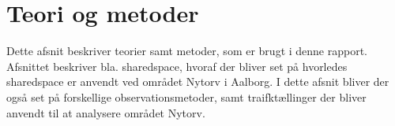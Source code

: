 \section{Teori og metoder}
Dette afsnit beskriver teorier samt metoder, som er brugt i denne rapport. Afsnittet beskriver bla. sharedspace, hvoraf der bliver set på hvorledes sharedspace er anvendt ved området Nytorv i Aalborg. I dette afsnit bliver der også set på forskellige observationsmetoder, samt traifktællinger der bliver anvendt til at analysere området Nytorv.



